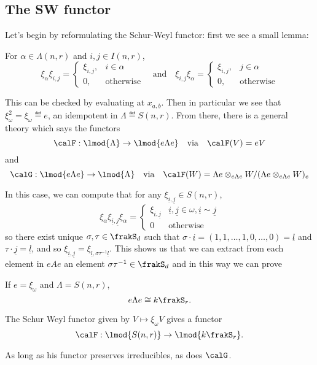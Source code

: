 \documentclass[12pt]{article}
\begin{document}
	\subsection{The SW functor}
	Let's begin by reformulating the Schur-Weyl functor: first we see a small lemma:
	\begin{lem}
		For $\alpha\in\Lambda(n,r)$ and $i,j\in I(n,r)$,
		\[\xi_\alpha\xi_{i,j}=\begin{cases}
			\xi_{i,j}, & i\in\alpha\\
			0, &\text{otherwise}
		\end{cases}\quad\text{and}\quad\xi_{i,j}\xi_\alpha=\begin{cases}
			\xi_{i,j}, & j\in\alpha\\
			0, &\text{otherwise}
		\end{cases}\]
	\end{lem}
	This can be checked by evaluating at $x_{\underline a,\underline b}$. Then in particular we see that $\xi_\omega^2=\xi_\omega\eqdef e$,
	an idempotent in $\Lambda\eqdef S(n,r)$. From there, there is a general theory which says the functors 
	\[\calF:\lmod{\Lambda}\to \lmod{e\Lambda e}\quad\text{via}\quad \calF(V)=eV\]
	and 
	\[\calG:\lmod{e\Lambda e}\to \lmod{\Lambda}\quad\text{via}\quad \calF(W)=\Lambda e\otimes_{e\Lambda e}W/(\Lambda e\otimes_{e\Lambda e}W)_e\]

	In this case, we can compute that for any $\xi_{\underline i,\underline j}\in S(n,r)$,
	\[\xi_\alpha\xi_{\underline i,\underline j}\xi_\alpha=\begin{cases}
		\xi_{\underline i,\underline j}& \underline i,\underline j\in \omega,\underline i\sim \underline j\\
		0 & \text{otherwise}
	\end{cases}\]
	so there exist unique $\sigma,\tau\in\frakS_d$ such that $\sigma\cdot\underline i=(1,1,\dots,1,0,\dots,0)=\underline l$ and $\tau\cdot\underline j=\underline l$,
	and so $\xi_{\underline i,\underline j}=\xi_{\underline l,\sigma\tau^{-1}\underline l}$.
	This shows us that we can extract from each element in $eAe$ an element $\sigma\tau^{-1}\in\frakS_d$ and in this way 
	we can prove 
	\begin{lem}
		If $e=\xi_\omega$ and $\Lambda=S(n,r)$,
		\[e\Lambda e\cong k\frakS_r.\]
	\end{lem}
	\begin{cor}
		The Schur Weyl functor given by $V\mapsto \xi_\omega V$ gives a functor 
		\[\calF:\lmod{S(n,r)}\to \lmod{k\frakS_r}.\]
	\end{cor}
	\begin{rmk}
		As long as his functor preserves irreducibles, as does $\calG$.
	\end{rmk}
\end{document}
